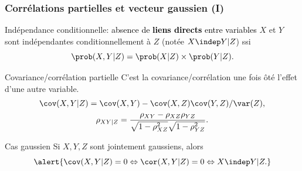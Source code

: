 \documentclass{beamer}\usepackage[]{graphicx}\usepackage[]{color}
\begin{document}
\begin{frame}
  \frametitle{Corrélations partielles et vecteur gaussien (I)}

  \begin{block}{Indépendance  conditionnelle: \textcolor{black}{absence  de
        \alert{\bf liens directs} entre variables}}
    $X$ et $Y$ sont indépendantes conditionnellement à $Z$ (notée $X \indep Y | Z$) ssi 
    \begin{equation*}
       \prob(X,Y|Z) = \prob(X|Z) \times \prob(Y|Z).
    \end{equation*}
  \end{block}

  \vspace{-.5cm}

   \begin{block}{Covariance/corrélation   partielle}
     C'est la covariance/corrélation une fois ôté l'effet d'une autre variable.
    \begin{gather*}
      \cov(X,Y|Z) = \cov(X,Y) - \cov(X,Z)\cov(Y,Z)/\var(Z),\\
      \rho_{XY|Z} = \frac{\rho_{XY} -
        \rho_{XZ}\rho_{YZ}}{\sqrt{1-\rho_{XZ}^2}\sqrt{1-\rho_{YZ}^2}}.
    \end{gather*}
  \end{block}

  \vspace{-.5cm}
  
  \begin{block}{Cas gaussien}
    Si $X,Y,Z$ sont jointement gaussiens, alors
    \begin{equation*}
      \alert{\cov(X,Y|Z) = 0  \Leftrightarrow \cor(X,Y|Z) = 0 \Leftrightarrow
        X \indep Y | Z.}
    \end{equation*}
  \end{block}

\end{frame}

\end{document}
